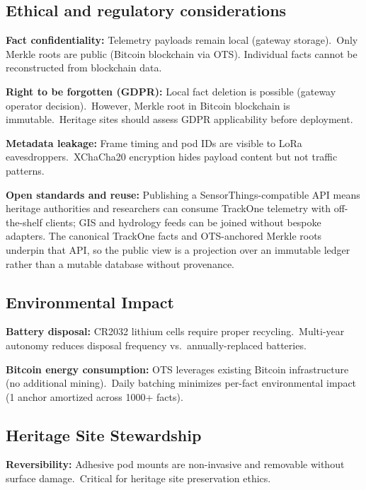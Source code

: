 \subsection{Ethical and regulatory considerations}\label{subsec:ethical-and-regulatory-considerations}

\textbf{Fact confidentiality:} Telemetry payloads remain local (gateway storage).\ Only Merkle roots are public (Bitcoin blockchain via \ac{OTS}). Individual facts cannot be reconstructed from blockchain data.

\textbf{Right to be forgotten (GDPR):} Local fact deletion is possible (gateway operator decision).\ However, Merkle root in Bitcoin blockchain is immutable.\ Heritage sites should assess \ac{GDPR} applicability before deployment.

\textbf{Metadata leakage:} Frame timing and pod IDs are visible to \ac{LoRa} eavesdroppers.\ XChaCha20 encryption hides payload content but not traffic patterns.

\textbf{Open standards and reuse:} Publishing a SensorThings-compatible \ac{API} means heritage authorities and researchers can consume TrackOne telemetry with off-the-shelf clients; \ac{GIS} and hydrology feeds can be joined without bespoke adapters.
The canonical TrackOne facts and \ac{OTS}-anchored Merkle roots underpin that \ac{API}, so the public view is a projection over an immutable ledger rather than a mutable database without provenance.

\subsection{Environmental Impact}\label{subsec:environmental-impact}

\textbf{Battery disposal:} CR2032 lithium cells require proper recycling.\ Multi-year autonomy reduces disposal frequency vs.\ annually-replaced batteries.

\textbf{Bitcoin energy consumption:} \ac{OTS} leverages existing Bitcoin infrastructure (no additional mining).\ Daily batching minimizes per-fact environmental impact (1 anchor amortized across 1000+ facts).

\subsection{Heritage Site Stewardship}\label{subsec:heritage-site-stewardship}

\textbf{Reversibility:} Adhesive pod mounts are non-invasive and removable without surface damage.\ Critical for heritage site preservation ethics.


